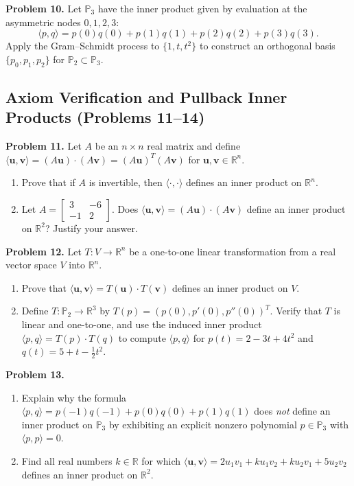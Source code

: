 \documentclass[11pt, letterpaper]{article}
\theoremstyle{definition}
\theoremstyle{remark}
\begin{document}
\textbf{Problem 10.} Let $\mathbb{P}_3$ have the inner product given by evaluation at the asymmetric nodes $0, 1, 2, 3$:
\[
\langle p, q \rangle = p(0)q(0) + p(1)q(1) + p(2)q(2) + p(3)q(3).
\]
Apply the Gram--Schmidt process to $\{1, t, t^2\}$ to construct an orthogonal basis $\{p_0, p_1, p_2\}$ for $\mathbb{P}_2 \subset \mathbb{P}_3$.

\subsection{Axiom Verification and Pullback Inner Products (Problems 11--14)}

\textbf{Problem 11.} Let $A$ be an $n \times n$ real matrix and define $\langle \mathbf{u}, \mathbf{v} \rangle = (A\mathbf{u}) \cdot (A\mathbf{v}) = (A\mathbf{u})^T(A\mathbf{v})$ for $\mathbf{u}, \mathbf{v} \in \mathbb{R}^n$.
\begin{enumerate}[label=(\alph*)]
    \item Prove that if $A$ is invertible, then $\langle \cdot, \cdot \rangle$ defines an inner product on $\mathbb{R}^n$.
    \item Let $A = \begin{bmatrix} 3 & -6 \\ -1 & 2 \end{bmatrix}$. Does $\langle \mathbf{u}, \mathbf{v} \rangle = (A\mathbf{u}) \cdot (A\mathbf{v})$ define an inner product on $\mathbb{R}^2$? Justify your answer.
\end{enumerate}

\textbf{Problem 12.} Let $T : V \to \mathbb{R}^n$ be a one-to-one linear transformation from a real vector space $V$ into $\mathbb{R}^n$.
\begin{enumerate}[label=(\alph*)]
    \item Prove that $\langle \mathbf{u}, \mathbf{v} \rangle = T(\mathbf{u}) \cdot T(\mathbf{v})$ defines an inner product on $V$.
    \item Define $T : \mathbb{P}_2 \to \mathbb{R}^3$ by $T(p) = (p(0), p'(0), p''(0))^T$. Verify that $T$ is linear and one-to-one, and use the induced inner product $\langle p, q \rangle = T(p) \cdot T(q)$ to compute $\langle p, q \rangle$ for $p(t) = 2 - 3t + 4t^2$ and $q(t) = 5 + t - \frac{1}{2}t^2$.
\end{enumerate}

\textbf{Problem 13.}
\begin{enumerate}[label=(\alph*)]
    \item Explain why the formula $\langle p, q \rangle = p(-1)q(-1) + p(0)q(0) + p(1)q(1)$ does \emph{not} define an inner product on $\mathbb{P}_3$ by exhibiting an explicit nonzero polynomial $p \in \mathbb{P}_3$ with $\langle p, p \rangle = 0$.
    \item Find all real numbers $k \in \mathbb{R}$ for which $\langle \mathbf{u}, \mathbf{v} \rangle = 2u_1v_1 + ku_1v_2 + ku_2v_1 + 5u_2v_2$ defines an inner product on $\mathbb{R}^2$.
\end{enumerate}
\end{document}
